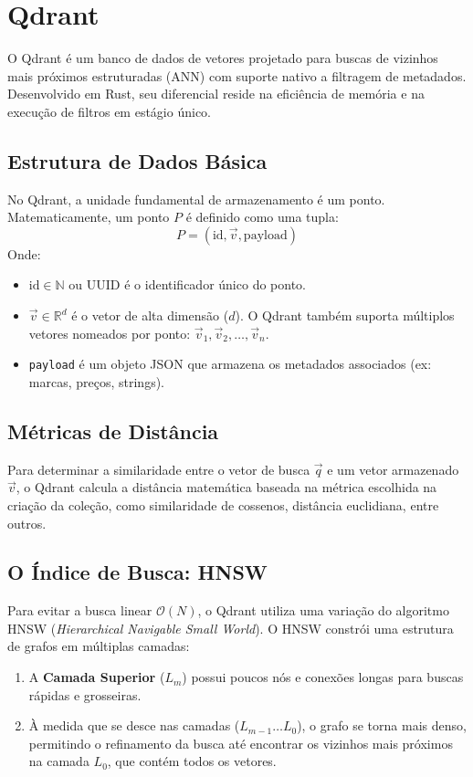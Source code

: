 \documentclass[a4paper, 12pt]{article}
\begin{document}
\section{Qdrant}
\label{sec:qdrant}

O Qdrant é um banco de dados de vetores projetado para buscas de vizinhos mais próximos estruturadas (ANN) com suporte nativo a filtragem de metadados. Desenvolvido em Rust, seu diferencial reside na eficiência de memória e na execução de filtros em estágio único.

\subsection{Estrutura de Dados Básica}
No Qdrant, a unidade fundamental de armazenamento é um ponto. Matematicamente, um ponto $P$ é definido como uma tupla:
\begin{equation}
P = (\text{id}, \vec{v}, \text{payload})
\end{equation}
Onde:
\begin{itemize}
    \item $\text{id} \in \mathbb{N}$ ou UUID é o identificador único do ponto.
    \item $\vec{v} \in \mathbb{R}^{d}$ é o vetor de alta dimensão ($d$). O Qdrant também suporta múltiplos vetores nomeados por ponto: $\vec{v}_{1}, \vec{v}_{2}, \dots, \vec{v}_{n}$.
    \item \texttt{payload} é um objeto JSON que armazena os metadados associados (ex: marcas, preços, strings).
\end{itemize}

\subsection{Métricas de Distância}
Para determinar a similaridade entre o vetor de busca $\vec{q}$ e um vetor armazenado $\vec{v}$, o Qdrant calcula a distância matemática baseada na métrica escolhida na criação da coleção, como similaridade de cossenos, distância euclidiana, entre outros.

\subsection{O Índice de Busca: HNSW}
Para evitar a busca linear $\mathcal{O}(N)$, o Qdrant utiliza uma variação do algoritmo HNSW (\textit{Hierarchical Navigable Small World}). O HNSW constrói uma estrutura de grafos em múltiplas camadas:
\begin{enumerate}
    \item A \textbf{Camada Superior} ($L_{m}$) possui poucos nós e conexões longas para buscas rápidas e grosseiras.
    \item À medida que se desce nas camadas ($L_{m-1} \dots L_{0}$), o grafo se torna mais denso, permitindo o refinamento da busca até encontrar os vizinhos mais próximos na camada $L_{0}$, que contém todos os vetores.
\end{enumerate}
\end{document}
